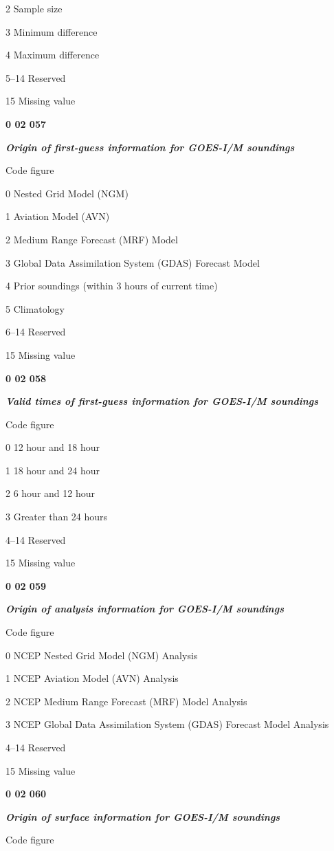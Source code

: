 2 Sample size

3 Minimum difference

4 Maximum difference

5--14 Reserved

15 Missing value

\textbf{0 02 057}

\emph{\textbf{Origin of first-guess information for GOES-I/M soundings}}

Code figure

0 Nested Grid Model (NGM)

1 Aviation Model (AVN)

2 Medium Range Forecast (MRF) Model

3 Global Data Assimilation System (GDAS) Forecast Model

4 Prior soundings (within 3 hours of current time)

5 Climatology

6--14 Reserved

15 Missing value

\textbf{0 02 058}

\emph{\textbf{Valid times of first-guess information for GOES-I/M soundings}}

Code figure

0 12 hour and 18 hour

1 18 hour and 24 hour

2 6 hour and 12 hour

3 Greater than 24 hours

4--14 Reserved

15 Missing value

\textbf{0 02 059}

\emph{\textbf{Origin of analysis information for GOES-I/M soundings}}

Code figure

0 NCEP Nested Grid Model (NGM) Analysis

1 NCEP Aviation Model (AVN) Analysis

2 NCEP Medium Range Forecast (MRF) Model Analysis

3 NCEP Global Data Assimilation System (GDAS) Forecast Model Analysis

4--14 Reserved

15 Missing value

\textbf{0 02 060}

\emph{\textbf{Origin of surface information for GOES-I/M soundings}}

Code figure

